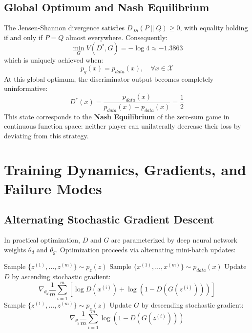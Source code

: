 \documentclass[conference]{IEEEtran}
\begin{document}
\subsection{Global Optimum and Nash Equilibrium}
The Jensen-Shannon divergence satisfies $D_{JS}(P \parallel Q) \ge 0$, with equality holding if and only if $P = Q$ almost everywhere. Consequently:
\begin{equation}
\min_G V(D^*, G) = -\log 4 \approx -1.3863
\end{equation}
which is uniquely achieved when:
\begin{equation}
p_g(x) = p_{data}(x), \quad \forall x \in \mathcal{X}
\end{equation}
At this global optimum, the discriminator output becomes completely uninformative:
\begin{equation}
D^*(x) = \frac{p_{data}(x)}{p_{data}(x) + p_{data}(x)} = \frac{1}{2}
\end{equation}
This state corresponds to the \textbf{Nash Equilibrium} of the zero-sum game in continuous function space: neither player can unilaterally decrease their loss by deviating from this strategy.

\section{Training Dynamics, Gradients, and Failure Modes}

\subsection{Alternating Stochastic Gradient Descent}
In practical optimization, $D$ and $G$ are parameterized by deep neural network weights $\theta_d$ and $\theta_g$. Optimization proceeds via alternating mini-batch updates:
\begin{algorithmic}[1]
        \STATE Sample $\{z^{(1)}, \dots, z^{(m)}\} \sim p_z(z)$
        \STATE Sample $\{x^{(1)}, \dots, x^{(m)}\} \sim p_{data}(x)$
        \STATE Update $D$ by ascending stochastic gradient:
        $$\nabla_{\theta_d} \frac{1}{m} \sum_{i=1}^m \left[ \log D(x^{(i)}) + \log(1 - D(G(z^{(i)}))) \right]$$
    \ENDFOR
    \STATE Sample $\{z^{(1)}, \dots, z^{(m)}\} \sim p_z(z)$
    \STATE Update $G$ by descending stochastic gradient:
    $$\nabla_{\theta_g} \frac{1}{m} \sum_{i=1}^m \log(1 - D(G(z^{(i)})))$$
\ENDFOR
\end{algorithmic}
\end{document}
